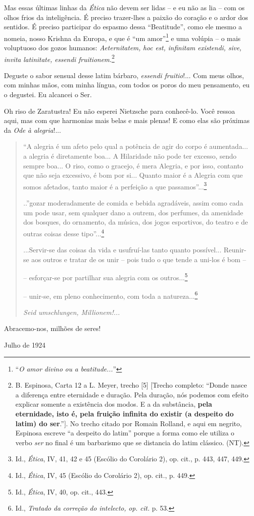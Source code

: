 Mas essas últimas linhas da \emph{Ética} não devem ser lidas -- e eu não
as lia -- com os olhos frios da inteligência. É preciso trazer-lhes a
paixão do coração e o ardor dos sentidos. É preciso participar do
espasmo dessa ``Beatitude'', como ele mesmo a nomeia, nosso Krishna da
Europa, e que é ``um amor''\footnote{``\emph{O amor divino ou a
  beatitude...}''} e uma volúpia -- o mais voluptuoso dos gozos humanos:
\emph{Aeternitatem, hoc est, infinitam existendi, sive, invita
latinitate, essendi fruitionem.}\footnote{B. Espinosa, Carta 12 a L.
  Meyer, trecho {[}5{]} {[}Trecho completo: ``Donde nasce a diferença
  entre eternidade e duração. Pela duração, nós podemos com efeito
  explicar somente a existência dos modos. E a da substância,
  \textbf{pela eternidade, isto é, pela fruição infinita do existir (a
  despeito do latim) do ser}.''{]}. No trecho citado por Romain Rolland,
  e aqui em negrito, Espinosa escreve ``a despeito do latim'' porque a
  forma como ele utiliza o verbo \emph{ser} no final é um barbarismo que
  se distancia do latim clássico. (NT).}

Deguste o sabor sensual desse latim bárbaro, \emph{essendi fruitio}!...
Com meus olhos, com minhas mãos, com minha língua, com todos os poros do
meu pensamento, eu o degustei. Eu alcancei o Ser.

Oh riso de Zaratustra! Eu não esperei Nietzsche para conhecê-lo. Você
ressoa aqui, mas com que harmonias mais belas e mais plenas! E como elas
são próximas da \emph{Ode à alegria}!...

\begin{quote}
``A alegria é um afeto pelo qual a potência de agir do corpo é
aumentada... a alegria é diretamente boa... A Hilaridade não pode ter
excesso, sendo sempre boa... O riso, como o gracejo, é mera Alegria, e
por isso, contanto que não seja excessivo, é bom por si... Quanto maior
é a Alegria com que somos afetados, tanto maior é a perfeição a que
passamos''...\footnote{Id., \emph{Ética}, IV, 41, 42 e 45 (Escólio do
  Corolário 2), op. cit., p. 443, 447, 449.}

..''gozar moderadamente de comida e bebida agradáveis, assim como cada
um pode usar, sem qualquer dano a outrem, dos perfumes, da amenidade dos
bosques, do ornamento, da música, dos jogos esportivos, do teatro e de
outras coisas desse tipo''...\footnote{Id., \emph{Ética}, IV, 45
  (Escólio do Corolário 2), op. cit., p. 449.}

...Servir-se das coisas da vida e usufruí-las tanto quanto possível...
Reunir-se aos outros e tratar de os unir -- pois tudo o que tende a
uni-los é bom --

-- esforçar-se por partilhar sua alegria com os outros...\footnote{Id.,
  \emph{Ética}, IV, 40, op. cit., 443.}

-- unir-se, em pleno conhecimento, com toda a natureza...\footnote{Id.,
  \emph{Tratado da correção do intelecto, op. cit.} p. 53.}

\emph{Seid umschlungen, Millionem!...}
\end{quote}

Abracemo-nos, milhões de seres!

Julho de 1924
